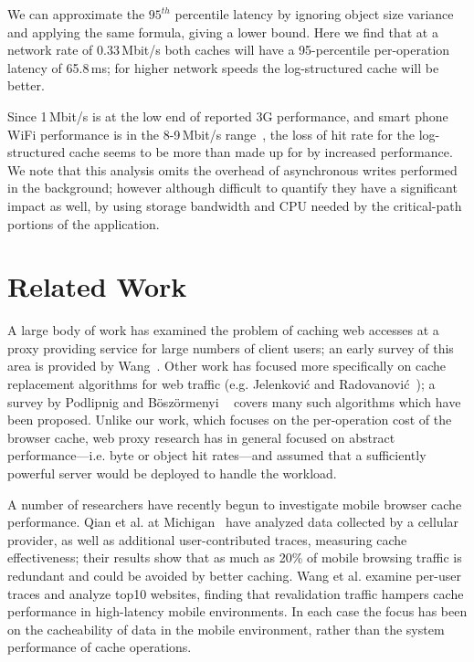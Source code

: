\documentclass{sig-alternate}
\begin{document}
We can approximate the $95^{th}$ percentile latency by ignoring object size
variance and applying the same formula, giving a lower bound. Here we find that
at a network rate of 0.33\,Mbit/s both caches will have a 95-percentile
per-operation latency of 65.8\,ms; for higher network speeds the log-structured
cache will be better.

Since 1\,Mbit/s is at the low end of reported 3G performance, and smart phone
WiFi performance is in the 8-9\,Mbit/s range~\cite{kim12}, the loss of hit rate
for the log-structured cache seems to be more than made up for by increased
performance. We note that this analysis omits the overhead of asynchronous
writes performed in the background; however although difficult to quantify they
have a significant impact as well, by using storage bandwidth and CPU needed by
the critical-path portions of the application.

\section{Related Work}
A large body of work has examined the problem of caching web accesses at a proxy
providing service for large numbers of client users; an early survey of this
area is provided by Wang~\cite{wang_survey_1999}. Other work has focused more
specifically on cache replacement algorithms for web traffic
(e.g. Jelenkovi\'{c} and Radovanovi\'{c}~\cite{Jelenkovic_optimizing_2004}); a
survey by Podlipnig and B\"{o}sz\"{o}rmenyi ~\cite{podlipnig_survey_2003} covers
many such algorithms which have been proposed. Unlike our work, which focuses on
the per-operation cost of the browser cache, web proxy research has in general
focused on abstract performance---i.e. byte or object hit rates---and assumed
that a sufficiently powerful server would be deployed to handle the workload.

A number of researchers have recently begun to investigate mobile browser cache
performance. Qian et al. at Michigan~\cite{qian_web_2012} have analyzed data
collected by a cellular provider, as well as additional user-contributed traces,
measuring cache effectiveness; their results show that as much as 20\% of mobile
browsing traffic is redundant and could be avoided by better caching. Wang et
al. \cite{wang_how_2011} examine per-user traces and analyze top10 websites,
finding that revalidation traffic hampers cache performance in high-latency
mobile environments. In each case the focus has been on the cacheability of data
in the mobile environment, rather than the system performance of cache
operations.
\end{document}
